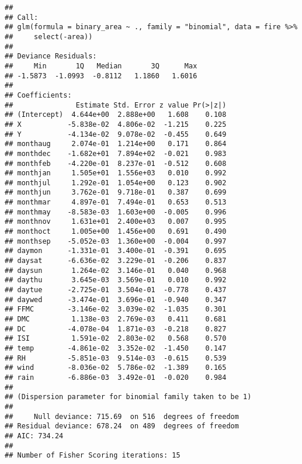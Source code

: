 \documentclass[
]{article}
\begin{document}
\begin{verbatim}
## 
## Call:
## glm(formula = binary_area ~ ., family = "binomial", data = fire %>% 
##     select(-area))
## 
## Deviance Residuals: 
##     Min       1Q   Median       3Q      Max  
## -1.5873  -1.0993  -0.8112   1.1860   1.6016  
## 
## Coefficients:
##               Estimate Std. Error z value Pr(>|z|)
## (Intercept)  4.644e+00  2.888e+00   1.608    0.108
## X           -5.838e-02  4.806e-02  -1.215    0.225
## Y           -4.134e-02  9.078e-02  -0.455    0.649
## monthaug     2.074e-01  1.214e+00   0.171    0.864
## monthdec    -1.682e+01  7.894e+02  -0.021    0.983
## monthfeb    -4.220e-01  8.237e-01  -0.512    0.608
## monthjan     1.505e+01  1.556e+03   0.010    0.992
## monthjul     1.292e-01  1.054e+00   0.123    0.902
## monthjun     3.762e-01  9.718e-01   0.387    0.699
## monthmar     4.897e-01  7.494e-01   0.653    0.513
## monthmay    -8.583e-03  1.603e+00  -0.005    0.996
## monthnov     1.631e+01  2.400e+03   0.007    0.995
## monthoct     1.005e+00  1.456e+00   0.691    0.490
## monthsep    -5.052e-03  1.360e+00  -0.004    0.997
## daymon      -1.331e-01  3.400e-01  -0.391    0.695
## daysat      -6.636e-02  3.229e-01  -0.206    0.837
## daysun       1.264e-02  3.146e-01   0.040    0.968
## daythu       3.645e-03  3.569e-01   0.010    0.992
## daytue      -2.725e-01  3.504e-01  -0.778    0.437
## daywed      -3.474e-01  3.696e-01  -0.940    0.347
## FFMC        -3.146e-02  3.039e-02  -1.035    0.301
## DMC          1.138e-03  2.769e-03   0.411    0.681
## DC          -4.078e-04  1.871e-03  -0.218    0.827
## ISI          1.591e-02  2.803e-02   0.568    0.570
## temp        -4.861e-02  3.352e-02  -1.450    0.147
## RH          -5.851e-03  9.514e-03  -0.615    0.539
## wind        -8.036e-02  5.786e-02  -1.389    0.165
## rain        -6.886e-03  3.492e-01  -0.020    0.984
## 
## (Dispersion parameter for binomial family taken to be 1)
## 
##     Null deviance: 715.69  on 516  degrees of freedom
## Residual deviance: 678.24  on 489  degrees of freedom
## AIC: 734.24
## 
## Number of Fisher Scoring iterations: 15
\end{verbatim}
\end{document}
